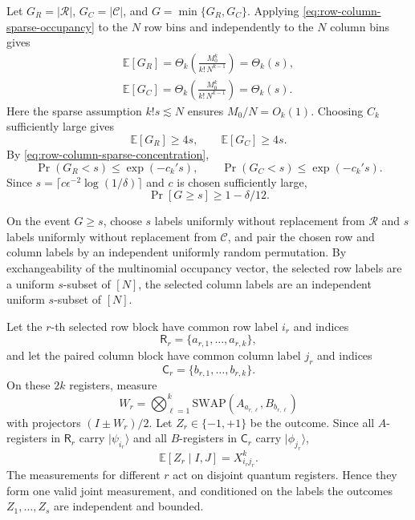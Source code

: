 \documentclass[aps,prx,reprint,superscriptaddress,amsmath,amssymb,longbibliography,floatfix]{revtex4-2}
\providecommand{\ket}[1]{|#1 \rangle}
\newcommand{\dsE}{\mathbb{E}}
\newcommand{\scC}{\mathcal{C}}
\newcommand{\scR}{\mathcal{R}}
\theoremstyle{plain}
\theoremstyle{definition}
\theoremstyle{remark}
\begin{document}
Let $G_R=|\scR|$, $G_C=|\scC|$, and $G=\min\{G_R,G_C\}$. Applying \eqref{eq:row-column-sparse-occupancy} to the $N$ row bins and independently to the $N$ column bins gives
$$
\begin{gathered}
\dsE[G_R]
=
\Theta_k\!\left(\frac{M_0^k}{k!\,N^{k-1}}\right)
=
\Theta_k(s),
\\
\dsE[G_C]
=
\Theta_k\!\left(\frac{M_0^k}{k!\,N^{k-1}}\right)
=
\Theta_k(s).
\end{gathered}
$$
Here the sparse assumption $k!s\lesssim N$ ensures $M_0/N=O_k(1)$. Choosing $C_k$ sufficiently large gives
$$
\dsE[G_R]\ge 4s,
\qquad
\dsE[G_C]\ge 4s.
$$
By \eqref{eq:row-column-sparse-concentration},
$$
\Pr(G_R<s)\le \exp(-c_k's),
\qquad
\Pr(G_C<s)\le \exp(-c_k's).
$$
Since $s=\lceil c\epsilon^{-2}\log(1/\delta)\rceil$ and $c$ is chosen sufficiently large,
$$
\Pr[G\ge s]\ge 1-\delta/12.
$$

On the event $G\ge s$, choose $s$ labels uniformly without replacement from $\scR$ and $s$ labels uniformly without replacement from $\scC$, and pair the chosen row and column labels by an independent uniformly random permutation. By exchangeability of the multinomial occupancy vector, the selected row labels are a uniform $s$-subset of $[N]$, the selected column labels are an independent uniform $s$-subset of $[N]$.

Let the $r$-th selected row block have common row label $i_r$ and indices
$$
\mathsf R_r=\{a_{r,1},\ldots,a_{r,k}\},
$$
and let the paired column block have common column label $j_r$ and indices
$$
\mathsf C_r=\{b_{r,1},\ldots,b_{r,k}\}.
$$
On these $2k$ registers, measure
\begin{equation}
W_r=\bigotimes_{\ell=1}^k \mathrm{SWAP}(A_{a_{r,\ell}},B_{b_{r,\ell}})
\label{eq:app-across-label-swap-observable}
\end{equation}
with projectors $(I\pm W_r)/2$. Let $Z_r\in\{-1,+1\}$ be the outcome. Since all $A$-registers in $\mathsf R_r$ carry $\ket{\psi_{i_r}}$ and all $B$-registers in $\mathsf C_r$ carry $\ket{\phi_{j_r}}$,
$$
\dsE[Z_r\mid I,J]=X_{i_rj_r}^k.
$$
The measurements for different $r$ act on disjoint quantum registers. Hence they form one valid joint measurement, and conditioned on the labels the outcomes $Z_1,\ldots,Z_s$ are independent and bounded.
\end{document}
